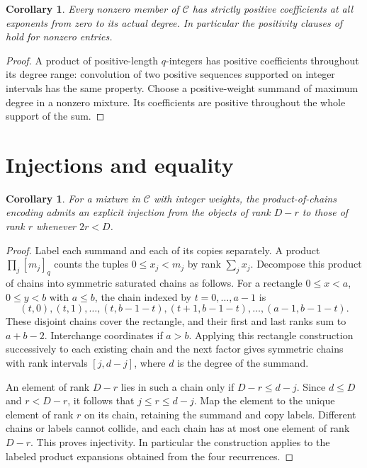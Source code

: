\documentclass[11pt]{article}
\newtheorem{corollary}[lemma]{Corollary}
\newcommand{\qi}[1]{[#1]_q}
\begin{document}
\begin{corollary}\label{cor:positive}
Every nonzero member of $\mathcal C$ has strictly positive coefficients
at all exponents from zero to its actual degree. In particular the
positivity clauses of \cite[Conjectures 7.4 and 7.5]{SS} hold for
nonzero entries.
\end{corollary}
\begin{proof}
A product of positive-length $q$-integers has positive coefficients
throughout its degree range: convolution of two positive sequences
supported on integer intervals has the same property. Choose a
positive-weight summand of maximum degree in a nonzero mixture.
Its coefficients are positive throughout the whole support of the sum.
\end{proof}

\section{Injections and equality}
\begin{corollary}\label{cor:injection}
For a mixture in $\mathcal C$ with integer weights, the product-of-chains
encoding admits an explicit injection from the objects of rank $D-r$
to those of rank $r$ whenever $2r<D$.
\end{corollary}
\begin{proof}
Label each summand and each of its copies separately. A product
$\prod_j\qi{m_j}$ counts the tuples $0\le x_j<m_j$ by rank $\sum_jx_j$.
Decompose this product of chains into symmetric saturated chains
as follows. For a rectangle $0\le x<a$, $0\le y<b$ with $a\le b$,
the chain indexed by $t=0,\ldots,a-1$ is
\[
 (t,0),(t,1),\ldots,(t,b-1-t),
 (t+1,b-1-t),\ldots,(a-1,b-1-t).
\]
These disjoint chains cover the rectangle, and their first and last
ranks sum to $a+b-2$. Interchange coordinates if $a>b$.
Applying this rectangle construction successively to each existing
chain and the next factor gives symmetric chains with rank intervals
$[j,d-j]$, where $d$ is the degree of the summand.

An element of rank $D-r$ lies in such a chain only if $D-r\le d-j$.
Since $d\le D$ and $r<D-r$, it follows that $j\le r\le d-j$.
Map the element to the unique element of rank $r$ on its chain,
retaining the summand and copy labels. Different chains or labels
cannot collide, and each chain has at most one element of rank $D-r$.
This proves injectivity. In particular the construction applies to
the labeled product expansions obtained from the four recurrences.
\end{proof}
\end{document}
